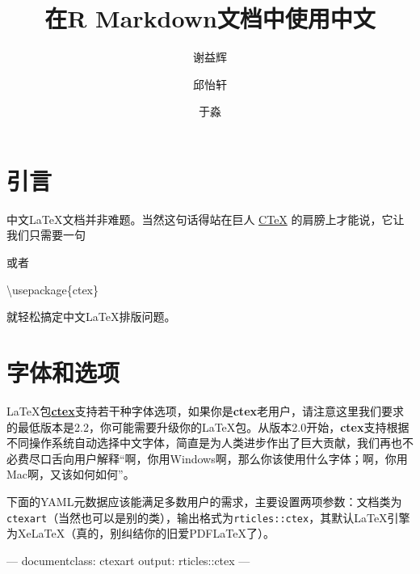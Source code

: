 \documentclass[hyperref,]{ctexart}
\title{在R Markdown文档中使用中文}
\author{谢益辉 \and 邱怡轩 \and 于淼}
\date{}
\newenvironment{Shaded}{\begin{snugshade}}{\end{snugshade}}
\newcommand{\AttributeTok}[1]{\textcolor[rgb]{0.77,0.63,0.00}{#1}}
\newcommand{\BuiltInTok}[1]{#1}
\newcommand{\CommentTok}[1]{\textcolor[rgb]{0.56,0.35,0.01}{\textit{#1}}}
\newcommand{\ExtensionTok}[1]{#1}
\newcommand{\FunctionTok}[1]{\textcolor[rgb]{0.00,0.00,0.00}{#1}}
\newcommand{\NormalTok}[1]{#1}
\newcommand{\OtherTok}[1]{\textcolor[rgb]{0.56,0.35,0.01}{#1}}
\begin{document}
\maketitle

{
\setcounter{tocdepth}{2}
\tableofcontents
}
\hypertarget{ux5f15ux8a00}{%
\section{引言}\label{ux5f15ux8a00}}

中文LaTeX文档并非难题。当然这句话得站在巨人 \href{http://ctex.org}{CTeX}
的肩膀上才能说，它让我们只需要一句

\begin{Shaded}
\end{Shaded}

或者

\begin{Shaded}
\begin{Highlighting}[]
\BuiltInTok{\textbackslash{}usepackage}\NormalTok{\{}\ExtensionTok{ctex}\NormalTok{\}}
\end{Highlighting}
\end{Shaded}

就轻松搞定中文LaTeX排版问题。

\hypertarget{ux5b57ux4f53ux548cux9009ux9879}{%
\section{字体和选项}\label{ux5b57ux4f53ux548cux9009ux9879}}

LaTeX包\href{http://ctan.org/pkg/ctex}{\textbf{ctex}}支持若干种字体选项，如果你是\textbf{ctex}老用户，请注意这里我们要求的最低版本是2.2，你可能需要升级你的LaTeX包。从版本2.0开始，\textbf{ctex}支持根据不同操作系统自动选择中文字体，简直是为人类进步作出了巨大贡献，我们再也不必费尽口舌向用户解释``啊，你用Windows啊，那么你该使用什么字体；啊，你用Mac啊，又该如何如何''。

下面的YAML元数据应该能满足多数用户的需求，主要设置两项参数：文档类为\texttt{ctexart}（当然也可以是别的类），输出格式为\texttt{rticles::ctex}，其默认LaTeX引擎为XeLaTeX（真的，别纠结你的旧爱PDFLaTeX了）。

\begin{Shaded}
\begin{Highlighting}[]
\OtherTok{---}
\FunctionTok{documentclass:}\AttributeTok{ ctexart}
\FunctionTok{output:}\AttributeTok{ rticles::ctex}
\OtherTok{---}
\end{Highlighting}
\end{Shaded}
\end{document}
